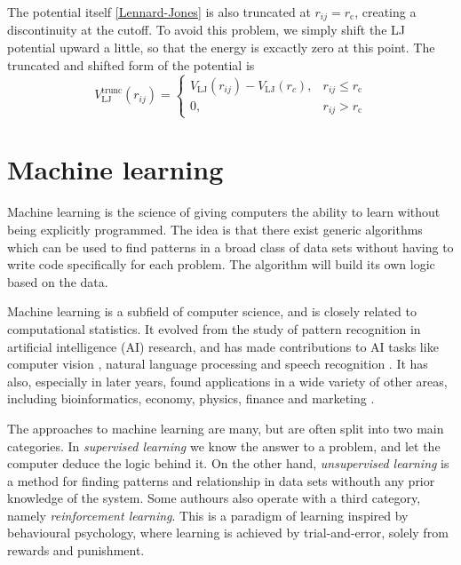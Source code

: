 \documentclass[twoside,english]{uiofysmaster}
\begin{document}
The potential itself \eqref{Lennard-Jones} is also truncated at $r_{ij} = r_\mathrm{c}$, creating a discontinuity 
at the cutoff. To avoid this problem, we simply shift the LJ potential upward a little, so that the energy 
is excactly zero at this point. The truncated and shifted form of the potential is
\begin{equation}
 V_{\mathrm{LJ}}^\mathrm{trunc}(r_{ij}) = 
 \begin{cases}
  V_\mathrm{LJ}(r_{ij}) - V_\mathrm{LJ}(r_c), & r_{ij} \leq r_\mathrm{c} \\
  0, & r_{ij} > r_\mathrm{c} 
 \end{cases}
 \label{shiftedLJ}
\end{equation}






\chapter{Machine learning} \label{sec:machineLearning}
Machine learning is the science of giving computers the ability to learn without being explicitly programmed. 
The idea is that there exist generic algorithms which can be used to find patterns in a broad class of data sets without 
having to write code specifically for each problem. The algorithm will build its own logic based on the data.  

Machine learning is a subfield of computer science, and is closely related to computational statistics. 
It evolved from the study of pattern recognition in artificial intelligence (AI) research, and has made contributions to
AI tasks like computer vision \cite{Krizhevsky12}, natural language processing \cite{Collobert11}
and speech recognition \cite{Hinton12}. It has also, especially in later years, 
found applications in a wide variety of other areas, including bioinformatics, economy, physics, finance and marketing
\cite{LeCun15}. 

The approaches to machine learning are many, but are often split into two main categories. 
In \textit{supervised learning} we know the answer to a problem,
and let the computer deduce the logic behind it. On the other hand, \textit{unsupervised learning}
is a method for finding patterns and relationship in data sets withouth any prior knowledge of the system.
Some authours also operate with a third category, namely \textit{reinforcement learning}. This is a paradigm 
of learning inspired by behavioural psychology, where learning is achieved by trial-and-error, 
solely from rewards and punishment.
\end{document}
